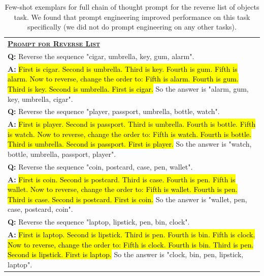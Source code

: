 \begingroup
\begin{table}[H]
    \centering
    \small
    \caption{    
    Few-shot exemplars for full chain of thought prompt for the reverse list of objects task.
    We found that prompt engineering improved performance on this task specifically (we did not do prompt engineering on any other tasks).
    }
    \begin{tabular}{p{\linewidth}}
        \toprule
        \underline{\textbf{\textsc{Prompt for Reverse List}}} \\
        \vspace{-2mm}
        \textbf{Q:} Reverse the sequence "cigar, umbrella, key, gum, alarm". \\
        \vspace{-1mm}
        \textbf{A:} \hl{First is cigar. Second is umbrella. Third is key. Fourth is gum. Fifth is alarm. Now to reverse, change the order to: Fifth is alarm. Fourth is gum. Third is key. Second is umbrella. First is cigar.} So the answer is "alarm, gum, key, umbrella, cigar". \\
        \vspace{0mm}
        \textbf{Q:} Reverse the sequence "player, passport, umbrella, bottle, watch". \\
        \vspace{-1mm}
        \textbf{A:} \hl{First is player. Second is passport. Third is umbrella. Fourth is bottle. Fifth is watch. Now to reverse, change the order to: Fifth is watch. Fourth is bottle. Third is umbrella. Second is passport. First is player.} So the answer is "watch, bottle, umbrella, passport, player". \\
        \vspace{0mm}
        \textbf{Q:} Reverse the sequence "coin, postcard, case, pen, wallet". \\
        \vspace{-1mm}
        \textbf{A:} \hl{First is coin. Second is postcard. Third is case. Fourth is pen. Fifth is wallet. Now to reverse, change the order to: Fifth is wallet. Fourth is pen. Third is case. Second is postcard. First is coin.} So the answer is "wallet, pen, case, postcard, coin". \\
        \vspace{0mm}
        \textbf{Q:} Reverse the sequence "laptop, lipstick, pen, bin, clock". \\
        \vspace{-1mm}
        \textbf{A:} \hl{First is laptop. Second is lipstick. Third is pen. Fourth is bin. Fifth is clock. Now to reverse, change the order to: Fifth is clock. Fourth is bin. Third is pen. Second is lipstick. First is laptop.} So the answer is "clock, bin, pen, lipstick, laptop". \\

\end{tabular}
\end{table}
